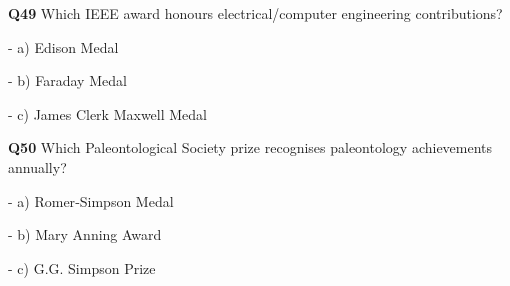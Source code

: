 \textbf{Q49} Which IEEE award honours electrical/computer engineering contributions?\par
\quad - a) Edison Medal\par
\quad - b) Faraday Medal\par
\quad - c) James Clerk Maxwell Medal\par

\textbf{Q50} Which Paleontological Society prize recognises paleontology achievements annually?\par
\quad - a) Romer‑Simpson Medal\par
\quad - b) Mary Anning Award\par
\quad - c) G.G. Simpson Prize\par
